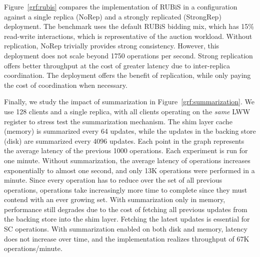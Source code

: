 Figure~\ref{grf:rubis} compares the \name implementation of RUBiS in a 
configuration against a single replica ({\sf\small NoRep}) and a strongly
replicated ({\sf\small StrongRep})  deployment. The benchmark uses the
default RUBiS bidding mix, which has 15\% read-write interactions, which is
representative of the auction workload.  Without replication, {\sf\small NoRep}
trivially provides strong consistency. However, this deployment does not scale
beyond 1750 operations per second. Strong replication offers better throughput
at the cost of greater latency due to inter-replica coordination. The \name
deployment offers the benefit of replication, while only paying the cost of
coordination when necessary.

Finally, we study the impact of summarization in
Figure~\ref{grf:summarization}. We use 128 clients and a single \name replica,
with all clients operating on the \emph{same} LWW register to stress test the
summarization mechanism. The shim layer cache (memory) is summarized every 64
updates, while the updates in the backing store (disk) are summarized every
4096 updates. Each point in the graph represents the average latency of the
previous 1000 operations. Each experiment is run for one minute.  Without
summarization, the average latency of operations increases exponentially to
almost one second, and only 13K operations were performed in a minute. Since
every operation has to reduce over the set of all previous operations,
operations take increasingly more time to complete since they must contend with
an ever growing set.  With summarization only in memory, performance still
degrades due to the cost of fetching all previous updates from the backing
store into the shim layer. Fetching the latest updates is essential for SC
operations. With summarization enabled on both disk and memory, latency does
not increase over time, and the implementation realizes throughput of 67K
operations/minute.

